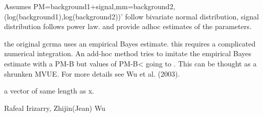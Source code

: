 \begin{Details}\relax
Assumes PM=background1+signal,mm=background2,
(log(background1),log(background2))' 
follow bivariate normal distribution, signal distribution follows power
law. 
 and  
provide adhoc estimates of the parameters.

the original gcrma uses an empirical Bayes estimate. this requires a
complicated numerical integration. An add-hoc method tries to imitate
the empirical Bayes estimate with a PM-B but values of PM-B<
going to . This can be thought as a shrunken MVUE. For more
details see Wu et al. (2003).
\end{Details}
\begin{Value}
a vector of same length as x.
\end{Value}
\begin{Author}\relax
Rafeal Irizarry, Zhijin(Jean) Wu
\end{Author}
\begin{SeeAlso}\relax
{}
\end{SeeAlso}

